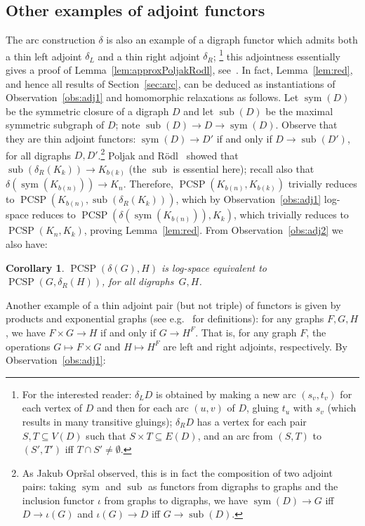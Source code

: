 \documentclass[11pt,a4paper]{scrartcl}
\numberwithin{theorem}{section}
\newtheorem{corollary}[theorem]{Corollary}
\theoremstyle{definition}
\DeclareMathOperator{\PCSP}{PCSP}
\DeclareMathOperator{\sub}{sub}
\DeclareMathOperator{\sym}{sym}
\begin{document}
\subsection{Other examples	of adjoint functors}\label{subsec:otherExamples}
The arc construction $\delta$ is also an example of a digraph functor which admits both a thin left adjoint $\delta_L$ and a thin right adjoint $\delta_R$;%
\footnote{For the interested reader: $\delta_L D$ is obtained by making a new arc $(s_v,t_v)$ for each vertex of $D$ and then for each arc $(u,v)$ of $D$, gluing $t_u$ with $s_v$ (which results in many transitive gluings); $\delta_R D$ has a vertex for each pair $S,T \subseteq V(D)$ such that $S \times T \subseteq E(D)$, and an arc from $(S,T)$ to $(S',T')$ iff $T \cap S' \neq \emptyset$.}
this adjointness essentially gives a proof of Lemma~\ref{lem:approxPoljakRodl}, see~\cite[Proposition~3.3]{FoniokT17}.
In fact, Lemma~\ref{lem:red}, and hence all results of Section~\ref{sec:arc}, can be deduced
as instantiations of Observation~\ref{obs:adj1} and homomorphic relaxations as follows.
Let $\sym(D)$ be the symmetric closure of a digraph $D$ and let $\sub(D)$ be the maximal symmetric subgraph of $D$; note $\sub(D) \to D \to \sym(D)$.
Observe that they are thin adjoint functors: $\sym(D) \to D'$ if and only if $D \to \sub(D')$, for all digraphs $D,D'$.\footnote{As Jakub Opr\v{s}al observed, this is in fact the composition of two adjoint pairs: taking $\sym$ and $\sub$ as functors from digraphs to graphs and the inclusion functor $\iota$ from graphs to digraphs, we have $\sym(D) \to G$ iff $D \to \iota(G)$ and $\iota(G) \to D$ iff $G \to \sub(D)$.}
Poljak and R\"odl~\cite{PoljakR81} showed that $\sub(\delta_R(K_{k})) \to K_{b(k)}$ (the $\sub$ is essential here); recall also that $\delta(\sym(K_{b(n)})) \to K_n$.
Therefore, $\PCSP(K_{b(n)},K_{b(k)})$ trivially reduces to $\PCSP(K_{b(n)},\sub(\delta_R(K_{k})))$,
which by Observation~\ref{obs:adj1} log-space reduces to $\PCSP(\delta(\sym(K_{b(n)})),K_k)$, which trivially reduces to $\PCSP(K_n,K_k)$,
proving Lemma~\ref{lem:red}.
From Observation~\ref{obs:adj2} we also have:

\begin{corollary}
	$\PCSP(\delta(G),H)$ is log-space equivalent to $\PCSP(G, \delta_R(H))$, %
	for all digraphs~$G, H$.
\end{corollary}


	
Another example of a thin adjoint pair (but not triple) of functors is given by products and exponential graphs (see e.g.~\cite{FoniokT13} for definitions):
for any graphs $F,G,H$, we have $F \times G \to H$ if and only if $G \to H^F$.
That is, for any graph $F$, the operations $G \mapsto F \times G$ and $H \mapsto H^F$ are left and right adjoints, respectively.
By Observation~\ref{obs:adj1}:
\end{document}
